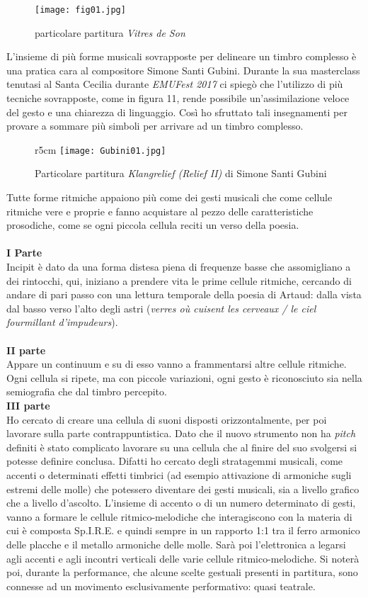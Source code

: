 \begin{wrapfigure}{r}{5cm}
\centering
\texttt{[image: fig01.jpg]}
\caption{particolare partitura \textit{Vitres de Son}}
\label{default}
\end{wrapfigure}

L'insieme di più forme musicali sovrapposte per delineare un timbro complesso è una pratica cara al compositore Simone Santi Gubini. Durante la sua masterclass tenutasi al Santa Cecilia durante \textit{EMUFest 2017} ci spiegò che l'utilizzo di più tecniche sovrapposte, come in figura 11, rende possibile un'assimilazione veloce del gesto e una chiarezza di linguaggio. Così ho sfruttato tali insegnamenti per provare a sommare più simboli per arrivare ad un timbro complesso.
\begin{figure}{r}{5cm}
\centering
\texttt{[image: Gubini01.jpg]}
\caption{Particolare partitura \textit{Klangrelief (Relief II)} di Simone Santi Gubini}
\label{default}
\end{figure}
Tutte forme ritmiche appaiono più come dei gesti musicali che come cellule ritmiche vere e proprie e fanno acquistare al pezzo delle caratteristiche prosodiche, come se ogni piccola cellula reciti un verso della poesia.
\\
\\
\textbf{I Parte} \\
Incipit è dato da una forma distesa piena di frequenze basse che assomigliano a dei rintocchi, qui, iniziano a prendere vita le prime cellule ritmiche, cercando di andare di pari passo con una lettura temporale della poesia di Artaud: dalla vista dal basso verso l'alto degli astri (\textit{verres où cuisent les cerveaux / le ciel fourmillant d'impudeurs}).
\\
\\
\textbf{II parte}\\
Appare un continuum e su di esso vanno a frammentarsi altre cellule ritmiche. Ogni cellula si ripete, ma con piccole variazioni, ogni gesto è riconosciuto sia nella semiografia che dal timbro percepito.
\\
\textbf{III parte}\\
Ho cercato di creare una cellula di suoni disposti orizzontalmente, per poi lavorare sulla parte contrappuntistica. Dato che il nuovo strumento non ha \textit{pitch} definiti è stato complicato lavorare su una cellula che al finire del suo svolgersi si potesse definire conclusa. Difatti ho cercato degli stratagemmi musicali, come accenti o determinati effetti timbrici (ad esempio attivazione di armoniche sugli estremi delle molle) che potessero diventare dei gesti musicali, sia a livello grafico che a livello d'ascolto. L'insieme di accento o di un numero determinato di gesti, vanno a formare le cellule ritmico-melodiche che interagiscono con la materia di cui è composta Sp.I.R.E. e quindi sempre in un rapporto 1:1 tra il ferro armonico delle placche e il metallo armoniche delle molle.
Sarà poi l'elettronica a legarsi agli accenti e agli incontri verticali delle varie cellule ritmico-melodiche. Si noterà poi, durante la performance, che alcune scelte gestuali presenti in partitura, sono connesse ad un movimento esclusivamente performativo: quasi teatrale.

